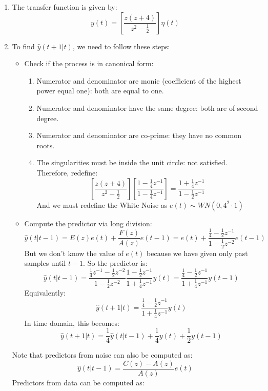 \begin{enumerate}
    \item The transfer function is given by:
        \[y(t)=\left[\dfrac{z(z+4)}{z^2-\frac{1}{2}}\right]\eta(t)\]
    \item To find $\hat{y}(t+1|t)$, we need to follow these steps:
        \begin{itemize}
            \item Check if the process is in canonical form:
                \begin{enumerate}
                    \item Numerator and denominator are monic (coefficient of the highest power equal one): both are equal to one.
                    \item Numerator and denominator have the same degree: both are of second degree.
                    \item Numerator and denominator are co-prime: they have no common roots.
                    \item The singularities must be inside the unit circle: not satisfied. 
                        Therefore, redefine: 
                        \[\left[\dfrac{z(z+4)}{z^2-\frac{1}{2}}\right]\left[\dfrac{1-\frac{1}{4}z^{-1}}{1-\frac{1}{4}z^{-1}}\right]=\dfrac{1+\frac{1}{4}z^{-1}}{1-\frac{1}{2}z^{-1}}\]
                        And we must redefine the White Noise as $e(t)\sim WN(0,4^2\cdot 1)$
                \end{enumerate}
            \item Compute the predictor via long division:
                \[\hat{y}(t|t-1)=E(z)e(t)+\dfrac{F(z)}{A(z)}e(t-1)=e(t)+\dfrac{\frac{1}{4}-\frac{1}{2}z^{-1}}{1-\frac{1}{2}z^{-2}}e(t-1)\]
                But we don't know the value of $e(t)$ because we have given only past samples until $t-1$.
                So the predictor is: 
                \[\hat{y}(t|t-1)=\dfrac{\frac{1}{4}z^{-1}-\frac{1}{2}z^{-2}}{1-\frac{1}{2}z^{-2}}\dfrac{1-\frac{1}{2}z^{-1}}{1+\frac{1}{4}z^{-1}}y(t)=\dfrac{\frac{1}{4}-\frac{1}{2}z^{-1}}{1+\frac{1}{4}z^{-1}}y(t-1)\]
                Equivalently: 
                \[\hat{y}(t+1|t)=\dfrac{\frac{1}{4}-\frac{1}{2}z^{-1}}{1+\frac{1}{4}z^{-1}}y(t)\]
                In time domain, this becomes:
                \[\hat{y}(t+1|t)=\dfrac{1}{4}\hat{y}(t|t-1)+\dfrac{1}{4}y(t)+\dfrac{1}{2}y(t-1)\]
        \end{itemize}
        Note that predictors from noise can also be computed as:
        \[\hat{y}(t|t-1)=\dfrac{C(z)-A(z)}{A(z)}e(t)\]
        Predictors from data can be computed as:

\end{enumerate}
